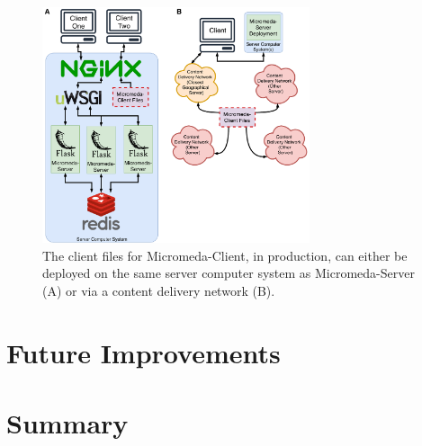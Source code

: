 \begin{figure}[!ht]
  \centering
	\includegraphics[width=0.7\textwidth]{media/micromeda-client-deployment.pdf}
	 \caption{The client files for Micromeda-Client, in production, can either be deployed on the same server computer system as Micromeda-Server (A) or via a content delivery network (B).}
	 \label{fig:client-deployment}
\end{figure}

\section{Future Improvements} \label{client-improvements}

\section{Summary} 